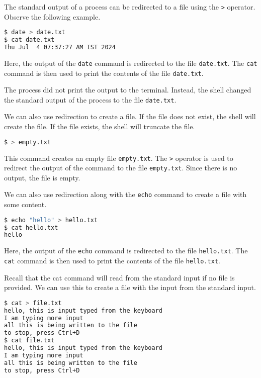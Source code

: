 The standard output of a process can be redirected to a file using the
\texttt{>} operator. Observe the following example.

\begin{lstlisting}[language=bash]
$ date > date.txt
$ cat date.txt
Thu Jul  4 07:37:27 AM IST 2024
\end{lstlisting}

Here, the output of the \texttt{date} command is redirected to the file
\texttt{date.txt}. The \texttt{cat} command is then used to print the
contents of the file \texttt{date.txt}.

The process did not print the output to the terminal. Instead, the shell
changed the standard output of the process to the file \texttt{date.txt}.

We can also use redirection to create a file. If the file does not exist,
the shell will create the file. If the file exists, the shell will truncate
the file.

\begin{lstlisting}[language=bash]
$ > empty.txt
\end{lstlisting}

This command creates an empty file \texttt{empty.txt}. The \texttt{>}
operator is used to redirect the output of the command to the file
\texttt{empty.txt}. Since there is no output, the file is empty.

We can also use redirection along with the \texttt{echo} command to
create a file with some content.

\begin{lstlisting}[language=bash]
$ echo "hello" > hello.txt
$ cat hello.txt
hello
\end{lstlisting}

Here, the output of the \texttt{echo} command is redirected to the file
\texttt{hello.txt}. The \texttt{cat} command is then used to print the
contents of the file \texttt{hello.txt}.

Recall that the cat command will read from the standard input if no
file is provided. We can use this to create a file with the input from
the standard input.

\begin{lstlisting}[language=bash]
$ cat > file.txt
hello, this is input typed from the keyboard
I am typing more input
all this is being written to the file
to stop, press Ctrl+D
$ cat file.txt
hello, this is input typed from the keyboard
I am typing more input
all this is being written to the file
to stop, press Ctrl+D
\end{lstlisting}

